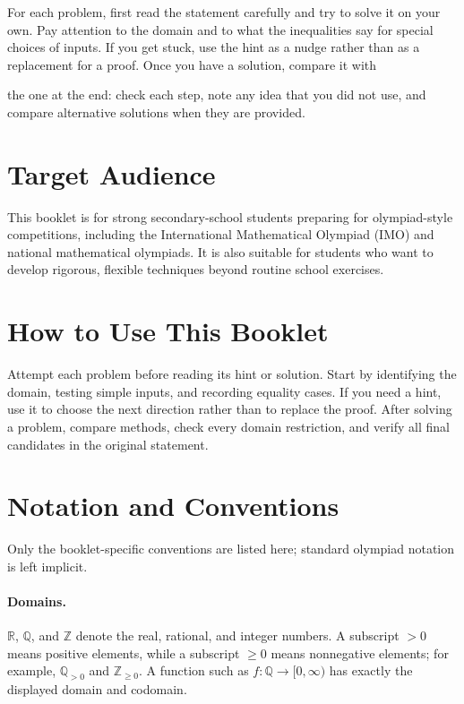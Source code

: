 \documentclass[12pt,a4paper]{article}
\begin{document}
For each problem, first read the statement carefully and try to solve it on
your own. Pay attention to the domain and to what the inequalities say for
special choices of inputs. If you get stuck, use the hint as a nudge rather
than as a replacement for a proof. Once you have a solution, compare it with

the one at the end: check each step, note any idea that you did not use, and
compare alternative solutions when they are provided.

\section*{Target Audience}

This booklet is for strong secondary-school students preparing for
olympiad-style competitions, including the International Mathematical
Olympiad (IMO) and national mathematical olympiads. It is also suitable for
students who want to develop rigorous, flexible techniques beyond routine
school exercises.

\section*{How to Use This Booklet}

Attempt each problem before reading its hint or solution. Start by identifying
the domain, testing simple inputs, and recording equality cases. If you need a
hint, use it to choose the next direction rather than to replace the proof.
After solving a problem, compare methods, check every domain restriction, and
verify all final candidates in the original statement.

\section*{Notation and Conventions}

Only the booklet-specific conventions are listed here; standard olympiad
notation is left implicit.

\paragraph{Domains.}
$\mathbb R$, $\mathbb Q$, and $\mathbb Z$ denote the real, rational, and
integer numbers. A subscript $>0$ means positive elements, while a subscript
$\ge0$ means nonnegative elements; for example,
$\mathbb Q_{>0}$ and $\mathbb Z_{\ge0}$. A function such as
$f:\mathbb Q\to[0,\infty)$ has exactly the displayed domain and codomain.
\end{document}
